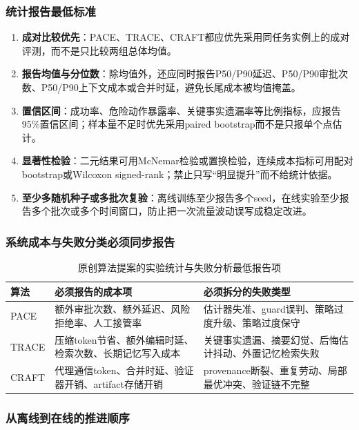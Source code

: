 \documentclass[12pt,a4paper]{article}
\begin{document}
\subsubsection{统计报告最低标准}

\begin{enumerate}
    \item \textbf{成对比较优先}：PACE、TRACE、CRAFT都应优先采用同任务实例上的成对评测，而不是只比较两组总体均值。
    \item \textbf{报告均值与分位数}：除均值外，还应同时报告P50/P90延迟、P50/P90审批次数、P50/P90上下文成本或合并时延，避免长尾成本被均值掩盖。
    \item \textbf{置信区间}：成功率、危险动作暴露率、关键事实遗漏率等比例指标，应报告95\%置信区间；样本量不足时优先采用paired bootstrap而不是只报单个点估计。
    \item \textbf{显著性检验}：二元结果可用McNemar检验或置换检验，连续成本指标可用配对bootstrap或Wilcoxon signed-rank；禁止只写“明显提升”而不给统计依据。
    \item \textbf{至少多随机种子或多批次复验}：离线训练至少报告多个seed，在线实验至少报告多个批次或多个时间窗口，防止把一次流量波动误写成稳定改进。
\end{enumerate}

\subsubsection{系统成本与失败分类必须同步报告}

\begin{table}[H]
\centering
\small
\caption{原创算法提案的实验统计与失败分析最低报告项}
\begin{tabular}{p{1.9cm}p{4.7cm}p{5.2cm}}
\toprule
\textbf{算法} & \textbf{必须报告的成本项} & \textbf{必须拆分的失败类型} \\
\midrule
PACE & 额外审批次数、额外延迟、风险拒绝率、人工接管率 & 估计器失准、guard误判、策略过度升级、策略过度保守 \\
TRACE & 压缩token节省、额外编辑时延、检索次数、长期记忆写入成本 & 关键事实遗漏、摘要幻觉、后悔估计抖动、外置记忆检索失败 \\
CRAFT & 代理通信token、合并时延、验证器开销、artifact存储开销 & provenance断裂、重复劳动、局部最优冲突、验证链不完整 \\
\bottomrule
\end{tabular}
\end{table}

\subsubsection{从离线到在线的推进顺序}
\end{document}
